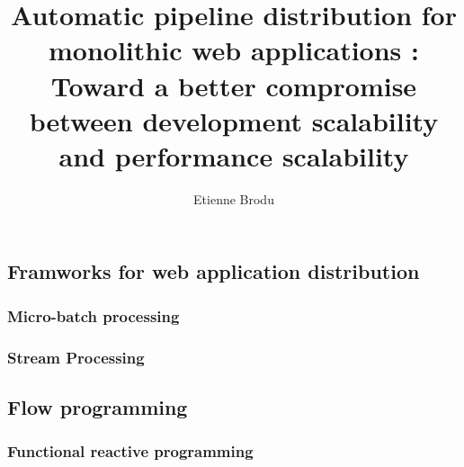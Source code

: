 \documentclass[12pt]{report}
\begin{document}
\title{Automatic pipeline distribution for monolithic web applications : Toward a better compromise between development scalability and performance scalability }
\author{Etienne Brodu}

\maketitle



\tableofcontents




% 


\chapter{}

  \section{Framworks for web application distribution}
    \subsection{Micro-batch processing}
    \subsection{Stream Processing}
  
  \section{Flow programming}
      \subsection{Functional reactive programming}
\end{document}
